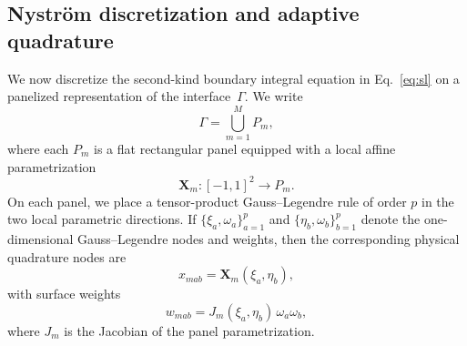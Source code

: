 \documentclass[preprint,12pt]{elsarticle}
\begin{document}
\subsection{Nystr\"om discretization and adaptive quadrature}\label{sec:quadrature}

We now discretize the second-kind boundary integral equation in Eq.~\eqref{eq:sl} on a panelized representation of the interface~$\Gamma$.
We write
\begin{equation}
\Gamma = \bigcup_{m=1}^{M} P_m,
\end{equation}
where each $P_m$ is a flat rectangular panel equipped with a local affine parametrization
\begin{equation}
\mathbf X_m:[-1,1]^2 \to P_m.
\end{equation}
On each panel, we place a tensor-product Gauss--Legendre rule of order $p$ in the two local parametric directions.
If $\{\xi_a,\omega_a\}_{a=1}^p$ and $\{\eta_b,\omega_b\}_{b=1}^p$ denote the one-dimensional Gauss--Legendre nodes and weights, then the corresponding physical quadrature nodes are
\begin{equation}
x_{mab} = \mathbf X_m(\xi_a,\eta_b),
\end{equation}
with surface weights
\begin{equation}
w_{mab} = J_m(\xi_a,\eta_b)\,\omega_a\omega_b,
\end{equation}
where $J_m$ is the Jacobian of the panel parametrization.
\end{document}
